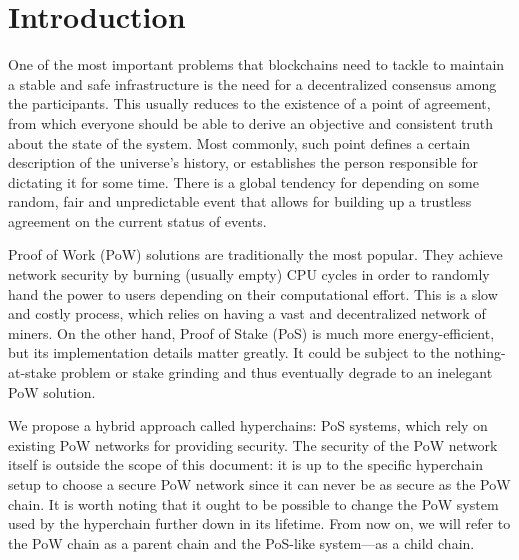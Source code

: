 \section{Introduction}

One of the most important problems that blockchains need to tackle to maintain a
stable and safe infrastructure is the need for a decentralized consensus among
the participants. This usually reduces to the existence of a point of agreement,
from which everyone should be able to derive an objective and consistent truth
about the state of the system. Most commonly, such point defines a certain
description of the universe's history, or establishes the person responsible for
dictating it for some time. There is a global tendency for depending on some
random, fair and unpredictable event that allows for building up a trustless
agreement on the current status of events.

Proof of Work (PoW) solutions are traditionally the most popular. They achieve
network security by burning (usually empty) CPU cycles in order to randomly hand
the power to users depending on their computational effort. This is a slow and
costly process, which relies on having a vast and decentralized network of
miners. On the other hand, Proof of Stake (PoS) is much more energy-efficient,
but its implementation details matter greatly. It could be subject to the
nothing-at-stake problem or stake grinding and thus eventually degrade to an
inelegant PoW solution.

We propose a hybrid approach called hyperchains: PoS systems, which rely on
existing PoW networks for providing security. The security of the PoW network
itself is outside the scope of this document: it is up to the specific
hyperchain setup to choose a secure PoW network since it can never be as secure
as the PoW chain. It is worth noting that it ought to be possible to change the
PoW system used by the hyperchain further down in its lifetime. From now on, we
will refer to the PoW chain as a parent chain and the PoS-like system---as a
child chain.
